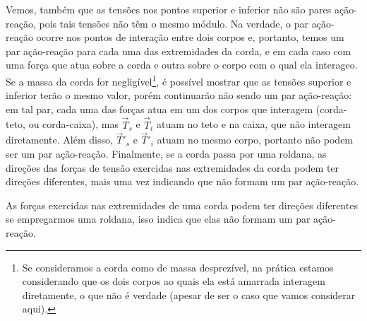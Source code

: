 Vemos, também que as tensões nos pontos superior e inferior não são pares ação-reação, pois tais tensões não têm o mesmo módulo. Na verdade, o par ação-reação ocorre nos pontos de interação entre dois corpos e, portanto, temos um par ação-reação para cada uma das extremidades da corda, e em cada caso com uma força que atua sobre a corda e outra sobre o corpo com o qual ela interageo. Se a massa da corda for negligível\footnote[][-2cm]{Se consideramos a corda como de massa desprezível, na prática estamos considerando que os dois corpos ao quais ela está amarrada interagem diretamente, o que não é verdade (apesar de ser o caso que vamos considerar aqui).}, é possível mostrar que as tensões superior e inferior terão o mesmo valor, porém continuarão não sendo um par ação-reação: em tal par, cada uma das forças atua em um dos corpos que interagem (corda-teto, ou corda-caixa), mas $\vec{T}_s$ e $\vec{T}_i$ atuam no teto e na caixa, que não interagem diretamente. Além disso, $\vec{T}'_s$ e $\vec{T}'_i$ atuam no mesmo corpo, portanto não podem ser um par ação-reação. Finalmente, se a corda passa por uma roldana, as direções das forças de tensão exercidas nas extremidades da corda podem ter direções diferentes, mais uma vez indicando que não formam um par ação-reação.
\begin{marginfigure}
\caption{As forças exercidas nas extremidades de uma corda podem ter direções diferentes se empregarmos uma roldana, isso indica que elas não formam um par ação-reação.}
\end{marginfigure}

